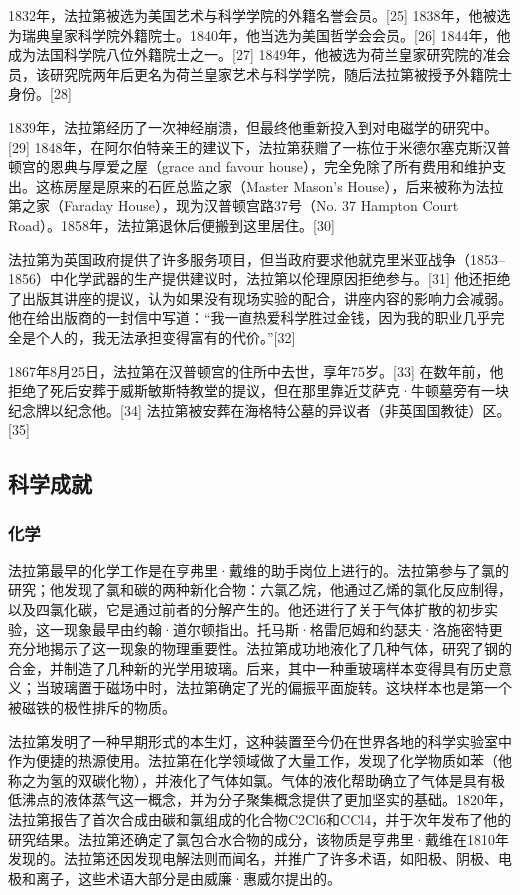 1832年，法拉第被选为美国艺术与科学学院的外籍名誉会员。[25] 1838年，他被选为瑞典皇家科学院外籍院士。1840年，他当选为美国哲学会会员。[26] 1844年，他成为法国科学院八位外籍院士之一。[27] 1849年，他被选为荷兰皇家研究院的准会员，该研究院两年后更名为荷兰皇家艺术与科学学院，随后法拉第被授予外籍院士身份。[28]

1839年，法拉第经历了一次神经崩溃，但最终他重新投入到对电磁学的研究中。[29] 1848年，在阿尔伯特亲王的建议下，法拉第获赠了一栋位于米德尔塞克斯汉普顿宫的恩典与厚爱之屋（grace and favour house），完全免除了所有费用和维护支出。这栋房屋是原来的石匠总监之家（Master Mason's House），后来被称为法拉第之家（Faraday House），现为汉普顿宫路37号（No. 37 Hampton Court Road）。1858年，法拉第退休后便搬到这里居住。[30]

法拉第为英国政府提供了许多服务项目，但当政府要求他就克里米亚战争（1853–1856）中化学武器的生产提供建议时，法拉第以伦理原因拒绝参与。[31] 他还拒绝了出版其讲座的提议，认为如果没有现场实验的配合，讲座内容的影响力会减弱。他在给出版商的一封信中写道：“我一直热爱科学胜过金钱，因为我的职业几乎完全是个人的，我无法承担变得富有的代价。”[32]

1867年8月25日，法拉第在汉普顿宫的住所中去世，享年75岁。[33] 在数年前，他拒绝了死后安葬于威斯敏斯特教堂的提议，但在那里靠近艾萨克·牛顿墓旁有一块纪念牌以纪念他。[34] 法拉第被安葬在海格特公墓的异议者（非英国国教徒）区。[35]
\subsection{科学成就}  
\subsubsection{化学}
法拉第最早的化学工作是在亨弗里·戴维的助手岗位上进行的。法拉第参与了氯的研究；他发现了氯和碳的两种新化合物：六氯乙烷，他通过乙烯的氯化反应制得，以及四氯化碳，它是通过前者的分解产生的。他还进行了关于气体扩散的初步实验，这一现象最早由约翰·道尔顿指出。托马斯·格雷厄姆和约瑟夫·洛施密特更充分地揭示了这一现象的物理重要性。法拉第成功地液化了几种气体，研究了钢的合金，并制造了几种新的光学用玻璃。后来，其中一种重玻璃样本变得具有历史意义；当玻璃置于磁场中时，法拉第确定了光的偏振平面旋转。这块样本也是第一个被磁铁的极性排斥的物质。

法拉第发明了一种早期形式的本生灯，这种装置至今仍在世界各地的科学实验室中作为便捷的热源使用。法拉第在化学领域做了大量工作，发现了化学物质如苯（他称之为氢的双碳化物），并液化了气体如氯。气体的液化帮助确立了气体是具有极低沸点的液体蒸气这一概念，并为分子聚集概念提供了更加坚实的基础。1820年，法拉第报告了首次合成由碳和氯组成的化合物C2Cl6和CCl4，并于次年发布了他的研究结果。法拉第还确定了氯包合水合物的成分，该物质是亨弗里·戴维在1810年发现的。法拉第还因发现电解法则而闻名，并推广了许多术语，如阳极、阴极、电极和离子，这些术语大部分是由威廉·惠威尔提出的。

